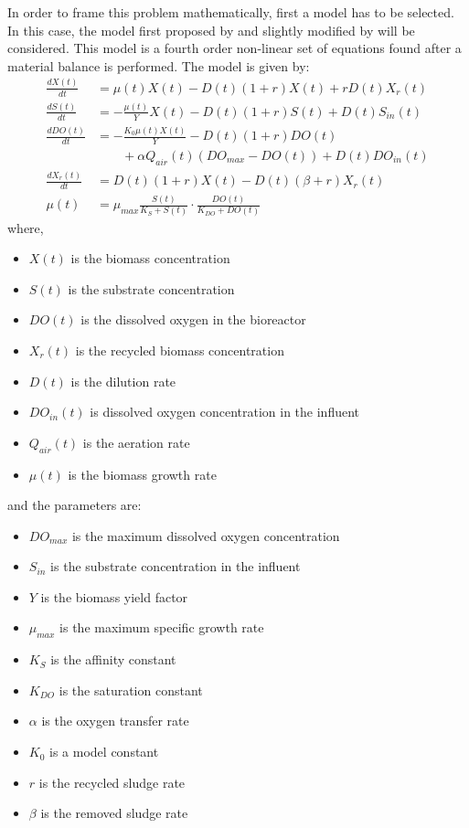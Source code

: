 In order to frame this problem mathematically, first a model has to be selected. In this case, the model first proposed by \citet{Nejjari1999} and slightly modified by \citet{Han2008} will be considered. This model is a fourth order non-linear set of equations found after a material balance is performed. The model is given by:
\begin{equation}
	\begin{split}
	\frac{d X (t)}{dt} &= \mu(t) X(t) - D(t) (1+r)X(t)+rD(t)X_r(t)\\
	\frac{d S (t)}{dt} &= -\frac{\mu(t)}{Y}X(t) - D(t)(1+r)S(t)+D(t)S_{in}(t)\\
	\frac{d DO (t)}{dt} &= - \frac{K_0 \mu(t) X(t)}{Y} - D(t)(1+r)DO(t)\\
					& \qquad + \alpha Q_{air}(t) \left(DO_{max} - DO(t)\right) +D(t) DO_{in}(t)\\
	\frac{d X_r (t)}{dt} &= D(t) (1+r) X(t)- D(t) \left( \beta + r \right) X_r(t)\\
	\mu(t) &= \mu_{max} \frac{S(t)}{K_S + S(t)} \cdot \frac{DO(t)}{K_{DO}+DO(t)}
	\end{split}
	\label{frac:WWTPModel}
\end{equation}
%
where,
\begin{itemize}
	\item $X(t)$ is the biomass concentration
	\item $S(t)$ is the substrate concentration
	\item $DO(t)$ is the dissolved oxygen in the bioreactor
	\item $X_r(t)$ is the recycled biomass concentration
	\item $D(t)$ is the dilution rate
	\item $DO_{in}(t)$ is dissolved oxygen concentration in the influent
	\item $Q_{air}(t)$ is the aeration rate
	\item $\mu(t)$ is the biomass growth rate
\end{itemize}
%
and the parameters are:
\begin{itemize}
	\item $DO_{max}$ is the maximum dissolved oxygen concentration
	\item $S_{in}$ is the substrate concentration in the influent
	\item $Y$ is the biomass yield factor
	\item $\mu_{max}$ is the maximum specific growth rate
	\item $K_S$ is the affinity constant
	\item $K_{DO}$ is the saturation constant
	\item $\alpha$ is the oxygen transfer rate
	\item $K_0$ is a model constant
	\item $r$ is the recycled sludge rate
	\item $\beta$ is the removed sludge rate
\end{itemize}

